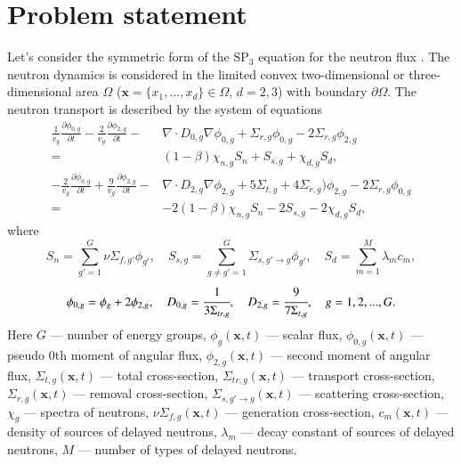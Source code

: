 \documentclass[authoryear]{elsarticle}
\begin{document}
\section{Problem statement}
Let’s consider the symmetric form of the $\mathrm{SP_3}$ equation for the neutron flux \citep{ryu2013fem}.
The neutron dynamics is considered in the limited convex two-dimensional or three-dimensional area $\Omega$ ($\bm x = \{x_1, ..., x_d\} \in \Omega, \, d = 2,3$) with boundary $\partial \Omega$.
The neutron transport is described by the system of equations
\begin{equation}\label{1}
\begin{split}
	\frac{1}{v_g} \frac{\partial \phi_{0,g}}{\partial t} - 
	\frac{2}{v_g} \frac{\partial \phi_{2,g}}{\partial t} - 
	& \nabla \cdot D_{0,g} \nabla \phi_{0,g} + 
	  \Sigma_{r,g} \phi_{0,g} -  
	2 \Sigma_{r,g} \phi_{2,g} \\ 
	= & (1 - \beta) \chi_{n,g} S_{n} + S_{s,g} + \chi_{d,g} S_d, \\
	- \frac{2}{v_g} \frac{\partial \phi_{0,g}}{\partial t} + 
	  \frac{9}{v_g} \frac{\partial \phi_{2,g}}{\partial t} - 
	& \nabla \cdot D_{2,g} \nabla \phi_{2,g} + 
	5 \Sigma_{t,g} + 4\Sigma_{r,g}) \phi_{2,g} - 
	2 \Sigma_{r,g} \phi_{0,g} \\
	= & - 2(1 - \beta) \chi_{n,g} S_{n} - 2 S_{s,g} - 2 \chi_{d,g} S_d,
\end{split}
\end{equation}
where
\[
	S_{n} = \sum_{g'=1}^{G} \nu \Sigma_{f,g'} \phi_{g'}, \quad
	S_{s,g} = \sum_{g\neq g'=1}^{G} \Sigma_{s,g' \rightarrow g} \phi_{g'}, \quad
	S_{d} = \sum_{m=1}^{M} \lambda_m c_m,
\]
\[
	\phi_{0,g} = \phi_g + 2\phi_{2,g}, \quad
	D_{0,g} = \cfrac{1}{3 \Sigma_{tr,g}}, \quad
	D_{2,g} = \cfrac{9}{7 \Sigma_{t,g}}, \quad g = 1,2,...,G.
\]
Here $G$ --- number of energy groups,
$\phi_g(\bm x, t)$ --- scalar flux,
$\phi_{0,g}(\bm x, t)$ --- pseudo 0th moment of angular flux,
$\phi_{2,g}(\bm x, t)$ --- second moment of angular flux,
$\Sigma_{t,g}(\bm x, t)$ --- total cross-section,
$\Sigma_{tr,g}(\bm x, t)$ --- transport cross-section, 
$\Sigma_{r,g}(\bm x, t)$ --- removal cross-section,
$\Sigma_{s,g' \rightarrow g}(\bm x, t)$ --- scattering cross-section,
$\chi_g$  --- spectra of neutrons,
$\nu \Sigma_{f,g}(\bm x, t)$ --- generation cross-section,
$c_m(\bm x, t)$ --- density of sources of delayed neutrons,
$\lambda_m$ --- decay constant of sources of delayed neutrons,
$M$ --- number of types of delayed neutrons.
\end{document}
